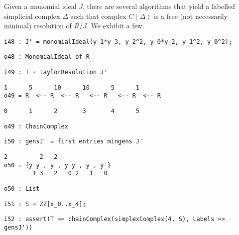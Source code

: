 \documentclass[12pt,leqno]{amsart}
\theoremstyle{definition}
\begin{document}
Given a monomial ideal $J$, there are several algorithms that yield a labelled
simplicial complex $\Delta$ such that complex $C(\Delta)$ is a free (not
necessarily minimal) resolution of $R/J$.  We exhibit a few.
\begin{lstlisting}[xleftmargin=10pt, aboveskip=3.0pt, belowskip=1.5pt]
i48 : J' = monomialIdeal(y_1*y_3, y_2^2, y_0*y_2, y_1^2, y_0^2);
\end{lstlisting}
\begin{lstlisting}[xleftmargin=10pt, aboveskip=1.5pt, belowskip=1.5pt]
o48 : MonomialIdeal of R
\end{lstlisting}
\begin{lstlisting}[xleftmargin=10pt, aboveskip=1.5pt, belowskip=1.5pt]
i49 : T = taylorResolution J'
\end{lstlisting}
\begin{lstlisting}[xleftmargin=10pt, lineskip=-10pt, aboveskip=1.5pt, belowskip=1.5pt]
       1      5      10      10      5      1
o49 = R  <-- R  <-- R   <-- R   <-- R  <-- R
\end{lstlisting}
\begin{lstlisting}[xleftmargin=10pt, aboveskip=1.5pt, belowskip=1.5pt] 
      0      1      2       3       4      5
\end{lstlisting}
\begin{lstlisting}[xleftmargin=10pt, aboveskip=1.5pt, belowskip=1.5pt]
o49 : ChainComplex
\end{lstlisting}
\begin{lstlisting}[xleftmargin=10pt, aboveskip=1.5pt, belowskip=1.5pt]
i50 : gensJ' = first entries mingens J'
\end{lstlisting}
\begin{lstlisting}[xleftmargin=10pt, lineskip=-10pt, aboveskip=1.5pt, belowskip=1.5pt]
              2         2   2
o50 = {y y , y , y y , y , y }
        1 3   2   0 2   1   0
\end{lstlisting}
\begin{lstlisting}[xleftmargin=10pt, aboveskip=1.5pt, belowskip=1.5pt]
o50 : List
\end{lstlisting}
\begin{lstlisting}[xleftmargin=10pt, aboveskip=1.5pt, belowskip=1.5pt]
i51 : S = ZZ[x_0..x_4];
\end{lstlisting}
\begin{lstlisting}[xleftmargin=10pt, aboveskip=1.5pt, belowskip=1.5pt]
i52 : assert(T == chainComplex(simplexComplex(4, S), Labels => gensJ'))
\end{lstlisting}
\end{document}
